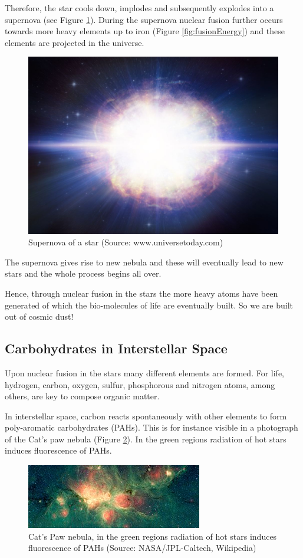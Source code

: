 \documentclass[
  11pt,
]{book}
\begin{document}
Therefore, the star cools down, implodes and subsequently explodes into a supernova (see Figure \ref{fig:supernova}). During the supernova nuclear fusion further occurs towards more heavy elements up to iron (Figure \ref{fig:fusionEnergy}) and these elements are projected in the universe.

\begin{figure}

{\centering \includegraphics[width=0.5\linewidth]{./figs/hires} 

}

\caption{Supernova of a star (Source:  www.universetoday.com)}\label{fig:supernova}
\end{figure}

The supernova gives rise to new nebula and these will eventually lead to new stars and the whole process begins all over.

Hence, through nuclear fusion in the stars the more heavy atoms have been generated of which the bio-molecules of life are eventually built. So we are built out of cosmic dust!

\newpage

\hypertarget{carbohydrates-in-interstellar-space}{%
\subsection{Carbohydrates in Interstellar Space}\label{carbohydrates-in-interstellar-space}}

Upon nuclear fusion in the stars many different elements are formed. For life, hydrogen, carbon, oxygen, sulfur, phosphorous and nitrogen atoms, among others, are key to compose organic matter.

In interstellar space, carbon reacts spontaneously with other elements to form poly-aromatic carbohydrates (PAHs). This is for instance visible in a photograph of the Cat's paw nebula (Figure \ref{fig:catPawNebula}). In the green regions radiation of hot stars induces fluorescence of PAHs.

\begin{figure}

{\centering \includegraphics[width=0.5\linewidth]{./figs/orionWithPAH} 

}

\caption{Cat's Paw nebula, in the green regions radiation of hot stars induces fluorescence of PAHs (Source: NASA/JPL-Caltech, Wikipedia)}\label{fig:catPawNebula}
\end{figure}
\end{document}
